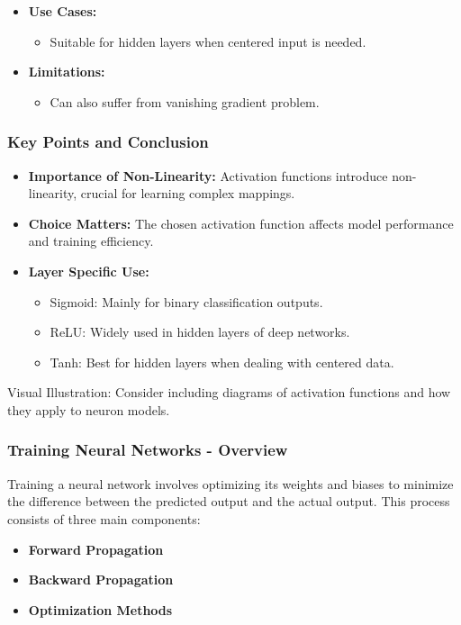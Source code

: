\documentclass{beamer}
\begin{document}
\begin{frame}[fragile]
\begin{enumerate}
\begin{itemize}
\begin{itemize}
                    \end{itemize}
                \item \textbf{Use Cases:}
                    \begin{itemize}
                        \item Suitable for hidden layers when centered input is needed.
                    \end{itemize}
                \item \textbf{Limitations:}
                    \begin{itemize}
                        \item Can also suffer from vanishing gradient problem.
                    \end{itemize}
            \end{itemize}
    \end{enumerate}
\end{frame}

\begin{frame}[fragile]
    \frametitle{Key Points and Conclusion}
    \begin{itemize}
        \item \textbf{Importance of Non-Linearity:} Activation functions introduce non-linearity, crucial for learning complex mappings.
        \item \textbf{Choice Matters:} The chosen activation function affects model performance and training efficiency.
        \item \textbf{Layer Specific Use:}
            \begin{itemize}
                \item Sigmoid: Mainly for binary classification outputs.
                \item ReLU: Widely used in hidden layers of deep networks.
                \item Tanh: Best for hidden layers when dealing with centered data.
            \end{itemize}
    \end{itemize}
    \begin{block}{Visual Illustration:}
        Consider including diagrams of activation functions and how they apply to neuron models.
    \end{block}
\end{frame}

\begin{frame}[fragile]
    \frametitle{Training Neural Networks - Overview}
    Training a neural network involves optimizing its weights and biases to minimize the difference between the predicted output and the actual output. This process consists of three main components:
    \begin{itemize}
        \item \textbf{Forward Propagation}
        \item \textbf{Backward Propagation}
        \item \textbf{Optimization Methods}
    \end{itemize}
\end{frame}
\end{document}
